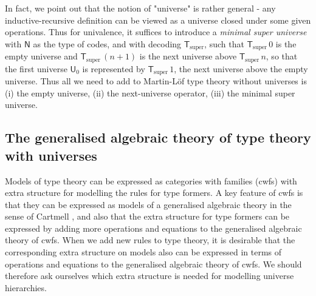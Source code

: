 \documentclass[11pt,a4paper]{article}
\def\UU{\mathsf{U}}
\newcommand{\N}{\mathsf{N}}
\newcommand{\T}{\mathsf{T}}
\newcommand{\Tsuper}{\T_{\mathrm{super}}}
\begin{document}
In fact, we point out that the notion of "universe" is rather general - any inductive-recursive definition can be viewed as a universe closed under some given operations. Thus for univalence, it suffices to introduce a {\em minimal super universe} with $\N$ as the type of codes, and with decoding $\Tsuper$,
such that $\Tsuper\,0$ is the empty universe and $\Tsuper\,(n + 1)$ is the next universe above $\Tsuper\,n$, so that the first universe $\UU_0$ is represented by $\Tsuper\,1$, the next universe above the empty universe. Thus all we need to add to Martin-Löf type theory without universes is (i) the empty universe, (ii) the next-universe operator, (iii) the minimal super universe.


\subsection{The generalised algebraic theory of type theory with universes}

Models of type theory can be expressed as categories with families (cwfs) with extra structure for modelling the rules for type formers.  A key feature of cwfs is that they can be expressed as models of a generalised algebraic theory in the sense of Cartmell \cite{cartmell:apal}, and also that the extra structure for type formers can be expressed by adding more operations and equations to the generalised algebraic theory of cwfs. When we add new rules to type theory, it is desirable that the corresponding extra structure on  models also can be expressed in terms of operations and equations to the generalised algebraic theory of cwfs. We should therefore ask ourselves which extra structure is needed for modelling universe hierarchies.
\end{document}
